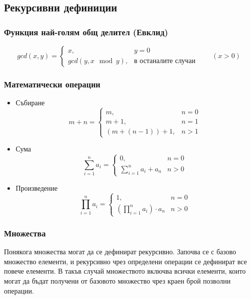 \documentclass[fleqn, 12pt]{article}
\theoremstyle{definition}
\begin{document}
\subsection{Рекурсивни дефиниции}

\subsubsection{Функция най-голям общ делител (Евклид)}
$$gcd(x,y) = 
\begin{cases} 
x, & y=0 \\ 
gcd(y, x \mod y), & \text{в останалите случаи}
\end{cases} \qquad (x > 0)$$

\subsubsection{Математически операции}
\begin{itemize} 
\item Събиране 
$$m + n = 
\begin{cases} 
m, & n=0 \\ 
m+1, & n = 1 \\
 (m + (n-1))+1, & n>1 
\end{cases}
$$
\item Сума 
$$
\sum_{i=1} ^n a_i = 
\begin{cases} 
0, & n = 0 \\
\sum_{i=1} ^{n} a_i + a_n & n>0  
\end{cases}
$$
\item Произведение 
$$
\prod _{i=1} ^n a_i = 
\begin{cases} 
1, & n = 0 \\
\left ( \prod_{i=1} ^{n} a_i \right) \cdot a_n & n>0  
\end{cases}
$$
\end{itemize}

\subsubsection{Множества} 
Понякога множества могат да се дефинират рекурсивно. Започва се с базово множество елементи, и рекурсивно чрез определени операции се дефинират все повече елементи. В такъв случай множеството включва всички елементи, които могат да бъдат получени от базовото множество чрез краен брой позволни операции.

\newpage
\end{document}
